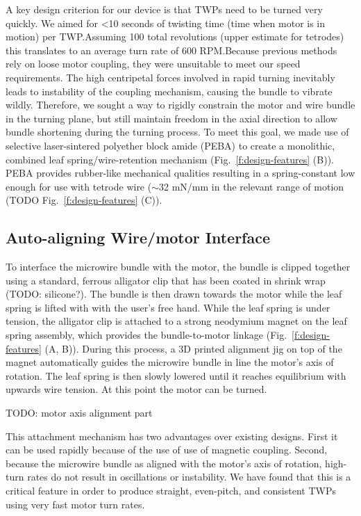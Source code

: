 \documentclass[11pt,a4paper]{article}
\begin{document}
A key design criterion for our device is that TWPs need to be turned very
quickly. We aimed for <10 seconds of twisting time (time when motor is in
motion) per TWP.\@ Assuming 100 total revolutions (upper estimate for tetrodes)
this translates to an average turn rate of 600 RPM.\@ Because previous methods
rely on loose motor coupling, they were unsuitable to meet our speed
requirements. The high centripetal forces involved in rapid turning inevitably
leads to instability of the coupling mechanism, causing the bundle to vibrate
wildly.  Therefore, we sought a way to rigidly constrain the motor and wire
bundle in the turning plane, but still maintain freedom in the axial direction
to allow bundle shortening during the turning process. To meet this goal, we
made use of selective laser-sintered polyether block amide (PEBA) to create a
monolithic, combined leaf spring/wire-retention mechanism
(Fig.~\ref{f:design-features} (B)). PEBA provides rubber-like mechanical
qualities resulting in a spring-constant low enough for use with tetrode wire
($\sim$32 mN/mm in the relevant range of motion (TODO
Fig.~\ref{f:design-features} (C)).

\subsection{Auto-aligning Wire/motor Interface}
To interface the microwire bundle with the motor, the bundle is clipped
together using a standard, ferrous alligator clip that has been coated in
shrink wrap (TODO: silicone?). The bundle is then drawn towards the motor while the leaf spring
is lifted with with the user's free hand. While the leaf spring is under
tension, the alligator clip is attached to a strong neodymium magnet on the
leaf spring assembly, which provides the bundle-to-motor linkage
(Fig.~\ref{f:design-features} (A, B)).  During this process, a 3D printed
alignment jig on top of the magnet  automatically guides the microwire bundle
in line the motor's axis of rotation. The leaf spring is then slowly lowered
until it reaches equilibrium with upwards wire tension. At this point the motor
can be turned.

TODO: motor axis alignment part

This attachment mechanism has two advantages over existing designs. First it
can be used rapidly because of the use of use of magnetic coupling. Second,
because the microwire bundle as aligned with the motor's axis of rotation,
high-turn rates do not result in oscillations or instability. We have found
that this is a critical feature in order to produce straight, even-pitch, and
consistent TWPs using very fast motor turn rates.
\end{document}

